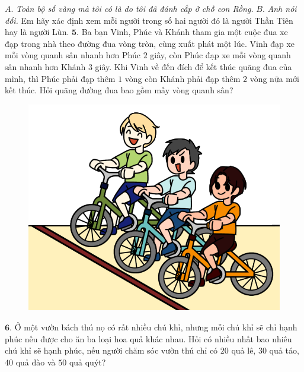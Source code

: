 \begin{multicols}{2}
\begin{figure}[H]
		\vspace*{-10pt}
	\end{figure}
	$A.$ \textit{Toàn bộ số vàng mà tôi có là do tôi đã đánh cắp ở chỗ con Rồng.}
	\vskip 0.1cm
	$B.$ \textit{Anh nói dối.}
	\vskip 0.1cm
	Em hãy xác định xem mỗi người trong số hai người đó là người Thần Tiên hay là người Lùn.
	\vskip 0.1cm
	$\pmb{5.}$ 	Ba bạn Vinh, Phúc và Khánh tham gia một cuộc đua xe đạp trong nhà theo đường đua vòng tròn, cùng xuất phát một lúc. Vinh đạp xe mỗi vòng quanh sân nhanh hơn Phúc $2$ giây, còn Phúc đạp xe mỗi vòng quanh sân nhanh hơn Khánh $3$ giây. Khi Vinh về đến đích để kết thúc quãng đua của mình, thì Phúc phải đạp thêm $1$ vòng còn Khánh phải đạp thêm $2$ vòng nữa mới kết thúc. Hỏi quãng đường đua bao gồm mấy vòng quanh sân?
	\begin{figure}[H]
			\centering
			\vspace*{-5pt}
			\captionsetup{labelformat= empty, justification=centering}
			\includegraphics[width=1\linewidth]{b5}
			\vspace*{-20pt}
		\end{figure}
	$\pmb{6.}$ 	Ở một vườn bách thú nọ có rất nhiều chú khỉ, nhưng mỗi chú khỉ sẽ chỉ hạnh phúc nếu được cho ăn ba loại hoa quả khác nhau. Hỏi có nhiều nhất bao nhiêu chú khỉ sẽ hạnh phúc, nếu người chăm sóc vườn thú chỉ có $20$ quả lê, $30$ quả táo, $40$ quả đào và $50$ quả quýt?
	\begin{figure}[H]
			\centering
			\vspace*{-10pt}
			\captionsetup{labelformat= empty, justification=centering}

\end{figure}
\end{multicols}
